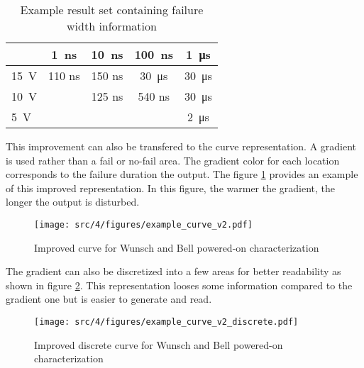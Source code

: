 \begin{table}[!h]
\centering
\begin{tabular}{@{}lcccc@{}}
\toprule
                & \SI{1}{\nano\second}         & \SI{10}{\nano\second}        & \SI{100}{\nano\second}                        & \SI{1}{\micro\second}     \\ \midrule
\SI{15}{\volt} & {\color[HTML]{00D2CB}110 ns} & {\color[HTML]{FFCB2F}150 ns} & {\color[HTML]{FE0000}\SI{30}{\micro\second}}  & {\color[HTML]{FE0000} \SI{30}{\micro\second}} \\
\SI{10}{\volt} & {\color[HTML]{32CB00}}       & {\color[HTML]{00D2CB}125 ns} & {\color[HTML]{F8A102}540 ns}                  & {\color[HTML]{FE0000} \SI{30}{\micro\second}} \\
\SI{5}{\volt}  & {\color[HTML]{32CB00}}       & {\color[HTML]{32CB00} }      & {\color[HTML]{32CB00} }                       & {\color[HTML]{F56B00} \SI{2}{\micro\second}}  \\
\bottomrule
\end{tabular}
\caption{Example result set containing failure width information}
\label{simulation-results-bis}
\end{table}

This improvement can also be transfered to the curve representation.
A gradient is used rather than a fail or no-fail area.
The gradient color for each location corresponds to the failure duration the output.
The figure \ref{wb_cz_curve_example_v2} provides an example of this improved representation.
In this figure, the warmer the gradient, the longer the output is disturbed.

\begin{figure}[!h]
  \centering
  \texttt{[image: src/4/figures/example\_curve\_v2.pdf]}
  \caption{Improved curve for Wunsch and Bell powered-on characterization}
  \label{wb_cz_curve_example_v2}
\end{figure}

The gradient can also be discretized into a few areas for better readability as shown in figure \ref{wb_cz_curve_example_v2_discrete}.
This representation looses some information compared to the gradient one but is easier to generate and read.

\begin{figure}[!h]
  \centering
  \texttt{[image: src/4/figures/example\_curve\_v2\_discrete.pdf]}
  \caption{Improved discrete curve for Wunsch and Bell powered-on characterization}
  \label{wb_cz_curve_example_v2_discrete}
\end{figure}

